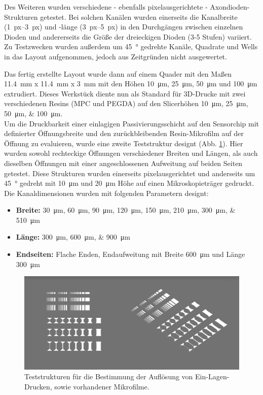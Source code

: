 Des Weiteren wurden verschiedene - ebenfalls pixelausgerichtete - Axondioden-Strukturen getestet. Bei solchen Kanälen wurden einerseits die Kanalbreite (\SIrange{1}{3}{px}) und -länge (\SIrange{3}{5}{px}) in den Durchgängen zwischen einzelnen Dioden und andererseits die Größe der dreieckigen Dioden (3-5 Stufen) variiert. Zu Testzwecken wurden außerdem um \SI{45}{\degree} gedrehte Kanäle, Quadrate und Wells in das Layout aufgenommen, jedoch aus Zeitgründen nicht ausgewertet.

Das fertig erstellte Layout wurde dann auf einem Quader mit den Maßen \SI{11.4}{\milli\meter} x \SI{11.4}{\milli\meter} x \SI{3}{\milli\meter} mit den Höhen \SI{10}{\micro\meter}, \SI{25}{\micro\meter}, \SI{50}{\micro\meter} und \SI{100}{\micro\meter} extrudiert. Dieses Werkstück diente nun als Standard für 3D-Drucke mit zwei verschiedenen Resins (MPC und PEGDA) auf den Slicerhöhen \SIlist{10; 25; 50; 100}{\micro\meter}.\\

Um die Druckbarkeit einer einlagigen Passivierungsschicht auf den Sensorchip mit definierter Öffnungsbreite und den zurückbleibenden Resin-Mikrofilm auf der Öffnung zu evaluieren, wurde eine zweite Teststruktur designt (Abb. \ref{fig:ResolutionLennart}). Hier wurden sowohl rechteckige Öffnungen verschiedener Breiten und Längen, als auch dieselben Öffnungen mit einer angeschlossenen Aufweitung auf beiden Seiten getestet. Diese Strukturen wurden einerseits pixelausgerichtet und anderseits um \SI{45}{\degree} gedreht mit \SI{10}{\micro\meter} und \SI{20}{\micro\meter} Höhe auf einen Mikroskopieträger gedruckt. Die Kanaldimensionen wurden mit folgenden Parametern designt:
\begin{itemize}
    \item \textbf{Breite:} \SIlist{30;60;90;120;150;210;300;510}{\micro\meter}
    \item \textbf{Länge:} \SIlist{300;600;900}{\micro\meter}
    \item \textbf{Endseiten:} Flache Enden, Endaufweitung mit Breite \SI{600}{\micro\meter} und Länge \SI{300}{\micro\meter}
\end{itemize}

\begin{figure}[!h]
    \centering
    \includegraphics[width=\linewidth]{img/ResolutionLennart.png}
    \caption{Teststrukturen für die Bestimmung der Auflösung von Ein-Lagen-Drucken, sowie vorhandener Mikrofilme.}
    \label{fig:ResolutionLennart}
\end{figure}

